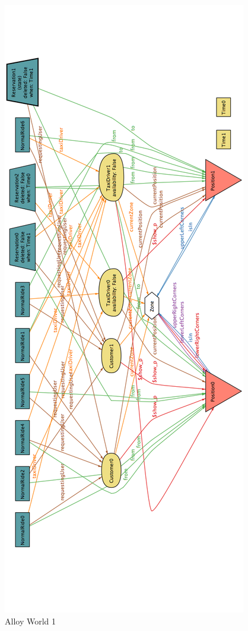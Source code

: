 				\begin{figure}[H]
					\centering
					\includegraphics[width=\textwidth, height=\textheight, scale=0.5]{IMG/ALLOY/alloyWorld.png}
					\caption{Alloy World 1}\label{sec:FigureAlloyWorld1}
				\end{figure}		